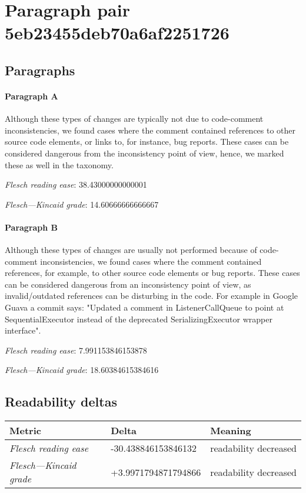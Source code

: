 \section{Paragraph pair 5eb23455deb70a6af2251726}
\subsection{Paragraphs}
\paragraph{Paragraph A}
Although these types of changes are typically not due to code-comment inconsistencies, we found cases where the comment contained references to other source code elements, or links to, for instance, bug reports. These cases can be considered dangerous from the inconsistency point of view, hence, we marked these as well in the taxonomy.\par\medskip\emph{Flesch reading ease}: 38.43000000000001\par\emph{Flesch---Kincaid grade}: 14.60666666666667

\paragraph{Paragraph B}
Although these types of changes are usually not performed because of code-comment inconsistencies, we found cases where the comment contained references, for example, to other source code elements or bug reports. These cases can be considered dangerous from an inconsistency point of view, as invalid/outdated references can be disturbing in the code. For example in Google Guava a commit says: "Updated a comment in ListenerCallQueue to point at SequentialExecutor instead of the deprecated SerializingExecutor wrapper interface".\par\medskip\emph{Flesch reading ease}: 7.991153846153878\par\emph{Flesch---Kincaid grade}: 18.60384615384616

\subsection{Readability deltas}

\begin{tabular}{lll}
\toprule
               \textbf{Metric} &       \textbf{Delta} &       \textbf{Meaning} \\
\midrule
    \emph{Flesch reading ease} &  -30.438846153846132 &  readability decreased \\
 \emph{Flesch---Kincaid grade} &  +3.9971794871794866 &  readability decreased \\
\bottomrule
\end{tabular}

